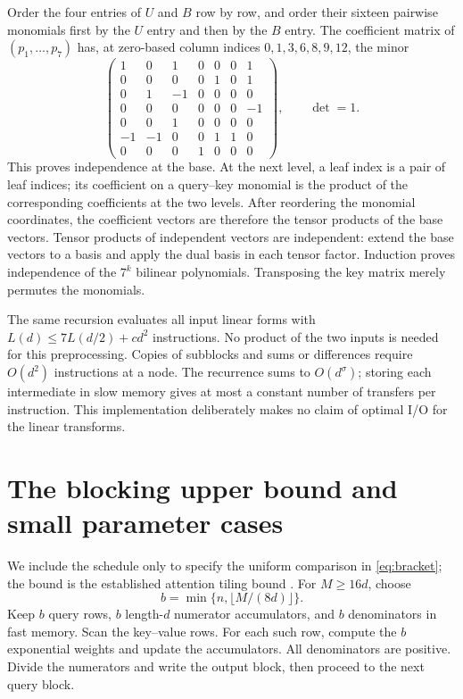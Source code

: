 \documentclass[11pt]{article}
\theoremstyle{definition}
\theoremstyle{remark}
\begin{document}
Order the four entries of $U$ and $B$ row by row, and order their
sixteen pairwise monomials first by the $U$ entry and then by the $B$
entry. The coefficient matrix of $(p_1,\ldots,p_7)$ has, at zero-based
column indices $0,1,3,6,8,9,12$, the minor
\begin{equation}
 \begin{pmatrix}
 1&0&1&0&0&0&1\\
 0&0&0&0&1&0&1\\
 0&1&-1&0&0&0&0\\
 0&0&0&0&0&0&-1\\
 0&0&1&0&0&0&0\\
 -1&-1&0&0&1&1&0\\
 0&0&0&1&0&0&0
 \end{pmatrix},
 \qquad \det=1.
 \label{eq:minor-seven}
\end{equation}
This proves independence at the base. At the next level, a leaf index
is a pair of leaf indices; its coefficient on a query--key monomial
is the product of the corresponding coefficients at the two levels.
After reordering the monomial coordinates, the coefficient vectors
are therefore the tensor products of the base vectors. Tensor
products of independent vectors are independent: extend the base
vectors to a basis and apply the dual basis in each tensor factor.
Induction proves independence of the $7^k$ bilinear polynomials.
Transposing the key matrix merely permutes the monomials.

The same recursion evaluates all input linear forms with
$L(d)\le7L(d/2)+c d^2$ instructions. No product of the two inputs is
needed for this preprocessing. Copies of subblocks and sums or
differences require $O(d^2)$ instructions at a node. The recurrence
sums to $O(d^\sigma)$; storing each intermediate in slow memory gives
at most a constant number of transfers per instruction. This
implementation deliberately makes no claim of optimal I/O for the
linear transforms.

\section{The blocking upper bound and small parameter cases}
\label{app:upper}
We include the schedule only to specify the uniform comparison in
\cref{eq:bracket}; the bound is the established attention tiling bound
\cite{dao2022,sahaye2024}. For $M\ge16d$, choose
\[
 b=\min\{n,\lfloor M/(8d)\rfloor\}.
\]
Keep $b$ query rows, $b$ length-$d$ numerator accumulators, and $b$
denominators in fast memory. Scan the key--value rows. For each such
row, compute the $b$ exponential weights and update the accumulators.
All denominators are positive. Divide the numerators and write the
output block, then proceed to the next query block.
\end{document}
